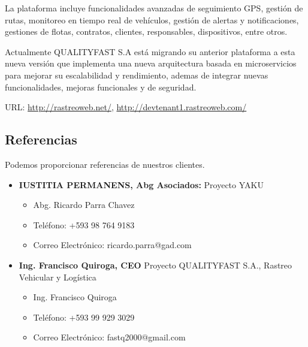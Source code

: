 \begin{itemize}
        La plataforma incluye funcionalidades avanzadas de seguimiento GPS, gestión de rutas, monitoreo en tiempo real de vehículos, gestión de alertas y notificaciones, gestiones de flotas, contratos, clientes, responsables, dispositivos, entre otros.
        
        Actualmente QUALITYFAST S.A está migrando su anterior plataforma a esta nueva versión que implementa una nueva arquitectura basada en microservicios para mejorar su escalabilidad y rendimiento, ademas de integrar nuevas funcionalidades, mejoras funcionales y de seguridad.

        URL: \url{http://rastreoweb.net/}, \url{http://devtenant1.rastreoweb.com/}
\end{itemize}

\subsection{Referencias}
Podemos proporcionar referencias de nuestros clientes.
\begin{itemize}
    \item \textbf{IUSTITIA PERMANENS, Abg Asociados:} Proyecto YAKU
    \begin{itemize}
        \item Abg. Ricardo Parra Chavez
        \item Teléfono: +593 98 764 9183
        \item Correo Electrónico: ricardo.parra@gad.com
    \end{itemize}
    \item \textbf{Ing. Francisco Quiroga, CEO} Proyecto QUALITYFAST S.A., Rastreo Vehicular y Logística
    \begin{itemize}
        \item Ing. Francisco Quiroga
        \item Teléfono: +593 99 929 3029
        \item Correo Electrónico: fastq2000@gmail.com
    \end{itemize}
\end{itemize}
